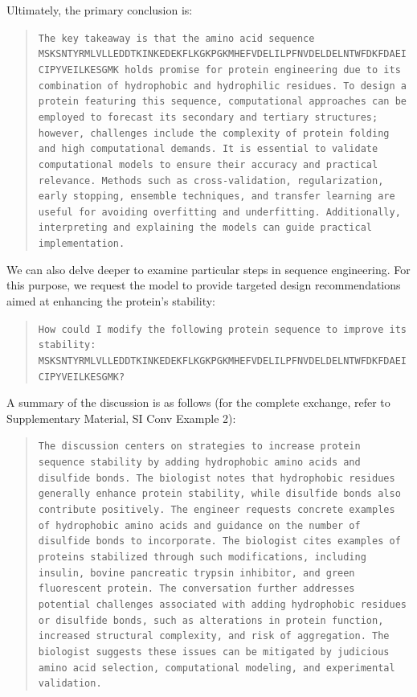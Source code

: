 Ultimately, the primary conclusion is:

\begin{quote}
\small\texttt{The key takeaway is that the amino acid sequence MSKSNTYRMLVLLEDDTKINKEDEKFLKGKPGKMHEFVDELILPFNVDELDELNTWFDKFDAEICIPYVEILKESGMK holds promise for protein engineering due to its combination of hydrophobic and hydrophilic residues. To design a protein featuring this sequence, computational approaches can be employed to forecast its secondary and tertiary structures; however, challenges include the complexity of protein folding and high computational demands. It is essential to validate computational models to ensure their accuracy and practical relevance. Methods such as cross-validation, regularization, early stopping, ensemble techniques, and transfer learning are useful for avoiding overfitting and underfitting. Additionally, interpreting and explaining the models can guide practical implementation.}
\end{quote}

We can also delve deeper to examine particular steps in sequence engineering. For this purpose, we request the model to provide targeted design recommendations aimed at enhancing the protein’s stability:

\begin{quote}
\small\texttt{How could I modify the following protein sequence to improve its stability: MSKSNTYRMLVLLEDDTKINKEDEKFLKGKPGKMHEFVDELILPFNVDELDELNTWFDKFDAEICIPYVEILKESGMK? }
\end{quote}

A summary of the discussion is as follows (for the complete exchange, refer to Supplementary Material, SI Conv Example 2):

\begin{quote}
\small\texttt{The discussion centers on strategies to increase protein sequence stability by adding hydrophobic amino acids and disulfide bonds. The biologist notes that hydrophobic residues generally enhance protein stability, while disulfide bonds also contribute positively. The engineer requests concrete examples of hydrophobic amino acids and guidance on the number of disulfide bonds to incorporate. The biologist cites examples of proteins stabilized through such modifications, including insulin, bovine pancreatic trypsin inhibitor, and green fluorescent protein. The conversation further addresses potential challenges associated with adding hydrophobic residues or disulfide bonds, such as alterations in protein function, increased structural complexity, and risk of aggregation. The biologist suggests these issues can be mitigated by judicious amino acid selection, computational modeling, and experimental validation.}
\end{quote}

